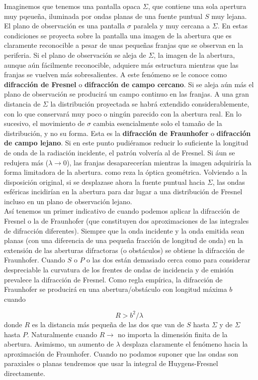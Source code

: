\documentclass[12pt,a4paper]{book}
\numberwithin{equation}{section}
\numberwithin{figure}{section}
\newcommand{\1}{_{(1)}}
\newcommand{\2}{_{(2)}}
\theoremstyle{definition}
\begin{document}
Imaginemos que tenemos una pantalla opaca $\Sigma$, que contiene una sola apertura muy pqeueña, iluminada por ondas planas de una fuente puntual $S$ muy lejana. El plano de observación es una pantalla $\sigma$ paralela y muy cercana a $\Sigma$. En estas condiciones se proyecta sobre la pantalla una imagen de la abertura que es claramente reconocible a pesar de unas pequeñas franjas que se observan en la periferia. Si el plano de observación se aleja de $\Sigma$, la imagen de la abertura, aunque aún fácilmente reconocible, adquiere más estructura mientras que las franjas se vuelven más sobresalientes. A este fenómeno se le conoce como \textbf{difracción de Fresnel} o \textbf{difracción de campo cercano}. Si se aleja aún más el plano de observación se producirá un campo continuo en las franjas. A una gran distancia de $\Sigma$ la distribución proyectada se habrá extendido considerablemente, con lo que conservará muy poco o ningún parecido con la abertura real. En lo sucesivo, el movimiento de $\sigma$ cambia esencialmente solo el tamaño de la distribución, y no su forma. Esta es la \textbf{difracción de Fraunhofer} o \textbf{difracción de campo lejano}. Si en este punto pudiéramos reducir lo suficiente la longitud de onda de la radiación incidente, el patrón volvería al de Fresnel. Si áun se redujera más ($\lambda \rightarrow 0$), las franjas desaparecerían mientras la imagen adquiriría la forma limitadora de la abertura. como reza la óptica geométrica. Volviendo a la disposición original, si se desplazase ahora la fuente puntual hacia $\Sigma$, las ondas esféricas incidirían en la abertura para dar lugar a una distribución de Fresnel incluso en un plano de observación lejano.  \\

Así tenemos un primer indicativo de cuando podemos aplicar la difracción de Fresnel o la de Fraunhofer (que constituyen dos aproximaciones de las integrales de difracción diferentes). Siempre que la onda incidente y la onda emitida sean planas (con una diferencia de una pequeña fracción de longitud de onda) en la extensión de las aberturas difractoras (o obstáculos) se obtiene la difracción de Fraunhofer. Cuando $S$ o $P$ o las dos están demasiado cerca como para considerar despreciable la curvatura de los frentes de ondas de incidencia y de emisión prevalece la difracción de Fresnel. Como regla empírica, la difracción de Fraunhofer se producirá en una abertura/obstáculo con longitud máxima $b$ cuando 

\begin{equation}
    R>b^2/\lambda
\end{equation}
donde $R$ es la distancia más pequeña de las dos que van de $S$ hasta $\Sigma$ y de $\Sigma$ hasta $P$. Naturalmente cuando $R\rightarrow$ no importa la dimensión finita de la abertura. Asimismo, un aumento de $\lambda$ desplaza claramente el fenómeno hacia la aproximación de Fraunhofer. Cuando no podamos suponer que las ondas son paraxiales o planas tendremos que usar la integral de Huygens-Fresnel directamente.
 
\end{document}
